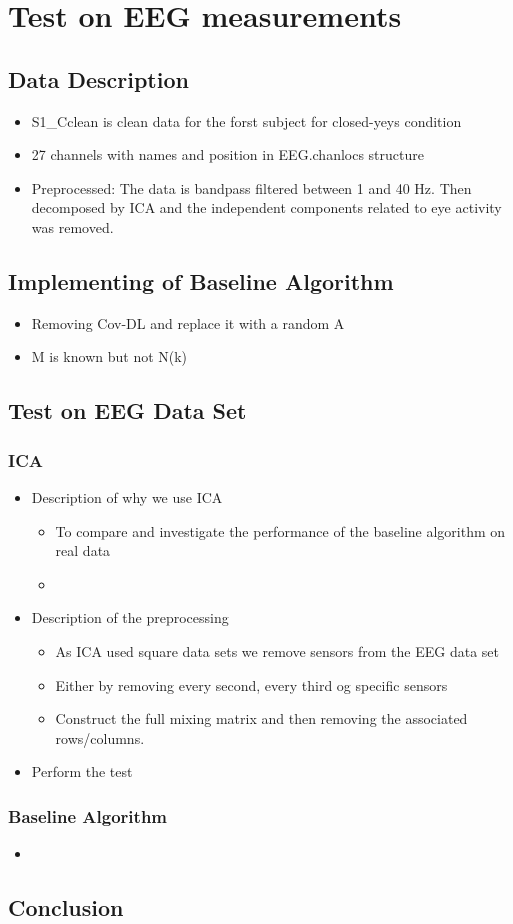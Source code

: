 \chapter{Test on EEG measurements}

\section{Data Description}
\begin{itemize}
\item S1\_Cclean is clean data for the forst subject for closed-yeys condition
\item 27 channels with names and position in EEG.chanlocs structure 
\item Preprocessed: The data is bandpass filtered between 1 and 40 Hz. Then decomposed by ICA and the independent components related to eye activity was removed.
\end{itemize}
\section{Implementing of Baseline Algorithm}
\begin{itemize}
\item Removing Cov-DL and replace it with a random A
\item M is known but not N(k)
\end{itemize}

\section{Test on EEG Data Set}

\subsection{ICA}
\begin{itemize}
\item Description of why we use ICA
	\begin{itemize}
	\item To compare and investigate the performance of the baseline algorithm on real data
	\item 
	\end{itemize}
\item Description of the preprocessing
	\begin{itemize}
	\item As ICA used square data sets we remove sensors from the EEG data set
	\item Either by removing every second, every third og specific sensors
	\item Construct the full mixing matrix and then removing the associated rows/columns.
	\end{itemize}
\item Perform the test
\end{itemize}

\subsection{Baseline Algorithm}
\begin{itemize}
\item 
\end{itemize}

\section{Conclusion}